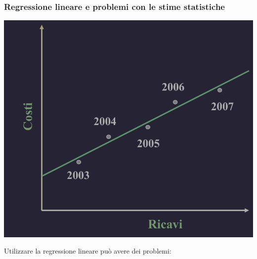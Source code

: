 \documentclass{article}
\begin{document}
\subsubsection{Regressione lineare e problemi con le stime statistiche}
\begin{center}
    \includegraphics[scale=0.3]{Image/RegressioneLin_1.png}
\end{center}
Utilizzare la regressione lineare può avere dei problemi:
\end{document}
